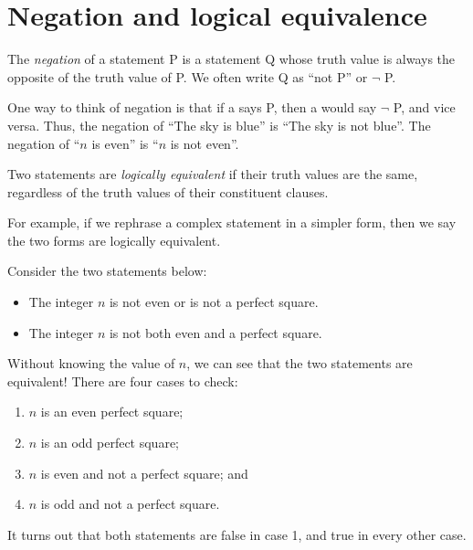 \documentclass{tufte-book}
\begin{document}


\section{Negation and logical equivalence}
\label{sec:negat-logic-equiv}

\begin{definition}
  The \emph{negation} of a statement P is a statement Q whose truth value is always the opposite of the truth value of P. We often write Q as ``not P'' or $\neg$ P.
\end{definition}
One way to think of negation is that if a \knave says P, then a \knight would say $\neg$ P, and vice versa. Thus, the negation of ``The sky is blue'' is ``The sky is not blue''. The negation of ``$n$ is even'' is ``$n$ is not even''.

\begin{definition}
  Two statements are \emph{logically equivalent}  if their truth values are the same, regardless of the truth values of their constituent clauses. 
\end{definition}
For example, if we rephrase a complex statement in a simpler form, then we say the two forms are logically equivalent. 

\begin{example}
  Consider the two statements below:
  \begin{itemize}
      \item The integer $n$ is not even or is not a perfect square.
      \item The integer $n$ is not both even and a perfect square.
  \end{itemize}
  Without knowing the value of $n$, we can see that the two statements are equivalent! There are four cases to check:
  \begin{enumerate}
      \item $n$ is an even perfect square;
      \item $n$ is an odd perfect square;
      \item $n$ is even and not a perfect square; and
      \item $n$ is odd and not a perfect square.
  \end{enumerate}
  It turns out that both statements are false in case 1, and true in every other case.
\end{example}
\end{document}
